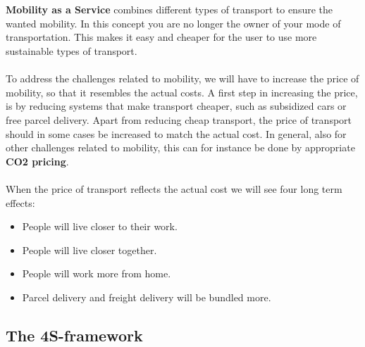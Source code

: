 \documentclass[../summary.tex]{subfiles}
\begin{document}
	\\\\
	\textbf{Mobility as a Service} combines different types of transport to ensure the wanted mobility. In this concept you are no longer the owner of your mode of transportation. This makes it easy and cheaper for the user to use more sustainable types of transport.
	\\\\
	To address the challenges related to mobility, we will have to increase the price of mobility, so that it resembles the actual costs. A first step in increasing the price, is by reducing systems that make transport cheaper, such as subsidized cars or free parcel delivery. Apart from reducing cheap transport, the price of transport should in some cases be increased to match the actual cost. In general, also for other challenges related to mobility, this can for instance be done by appropriate \textbf{CO2 pricing}.\\
	\\
	When the price of transport reflects the actual cost we will see four long term effects:
	\begin{itemize}
		\setlength{\itemsep}{0pt}
		\item People will live closer to their work.
		\item People will live closer together.
		\item People will work more from home.
		\item Parcel delivery and freight delivery will be bundled more.
	\end{itemize}
	
	
	\subsection{The 4S-framework}
	
\end{document}
